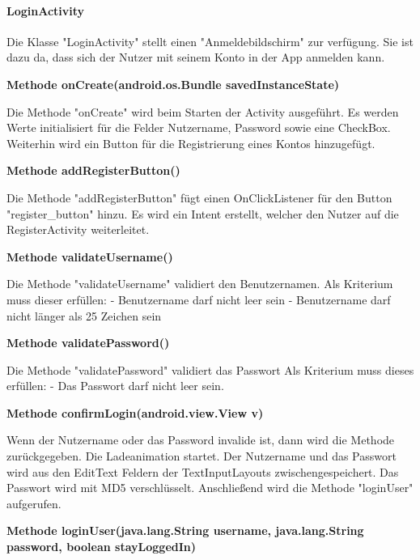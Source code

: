 \documentclass{scrartcl}
\begin{document}
\paragraph{LoginActivity}
Die Klasse "LoginActivity" stellt einen "Anmeldebildschirm" zur verfügung. Sie ist dazu da, dass sich der Nutzer mit seinem Konto in der App anmelden kann. \newline 

\noindent\textbf{Methode onCreate(android.os.Bundle savedInstanceState)}

\noindent Die Methode "onCreate" wird beim Starten der Activity ausgeführt. Es werden Werte initialisiert für die Felder Nutzername, Password sowie eine CheckBox. Weiterhin wird ein Button für die Registrierung eines Kontos hinzugefügt. \newline 

\noindent\textbf{Methode addRegisterButton()}

\noindent Die Methode "addRegisterButton" fügt einen OnClickListener für den Button "register\_button" hinzu. Es wird ein Intent erstellt, welcher den Nutzer auf die RegisterActivity weiterleitet. \newline

\noindent\textbf{Methode validateUsername()}

\noindent Die Methode "validateUsername" validiert den Benutzernamen. Als Kriterium muss dieser erfüllen: - Benutzername darf nicht leer sein - Benutzername darf nicht länger als 25 Zeichen sein \newline 

\noindent\textbf{Methode validatePassword()}

\noindent Die Methode "validatePassword" validiert das Passwort Als Kriterium muss dieses erfüllen: - Das Passwort darf nicht leer sein. \newline 

\noindent\textbf{Methode confirmLogin(android.view.View v)}

\noindent Wenn der Nutzername oder das Password invalide ist, dann wird die Methode zurückgegeben. Die Ladeanimation startet. Der Nutzername und das Passwort wird aus den EditText Feldern der TextInputLayouts zwischengespeichert. Das Passwort wird mit MD5 verschlüsselt. Anschließend wird die Methode "loginUser" aufgerufen. \newline 

\noindent\textbf{Methode loginUser(java.lang.String username, \newline                     java.lang.String password, boolean stayLoggedIn)}
\end{document}
